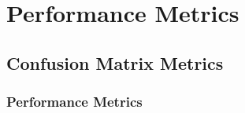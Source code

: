 \chapter{Performance Metrics} \label{app_Metrics}

\section{Confusion Matrix Metrics} \label{sec_ConfMatMets}

\subsection{Performance Metrics}

